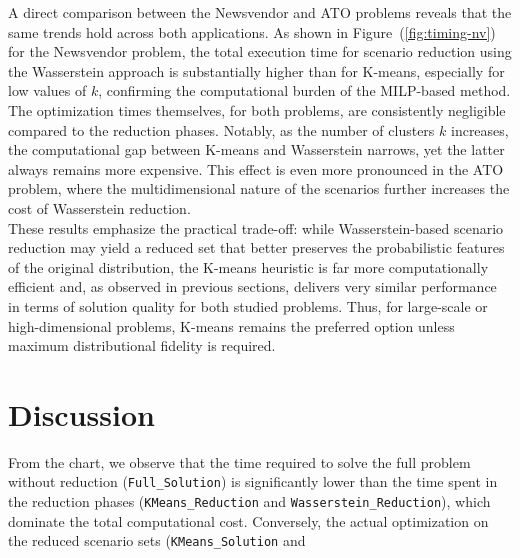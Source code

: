 \documentclass[a4paper,12pt]{article}
\begin{document}
	\noindent
	A direct comparison between the Newsvendor and ATO problems reveals that the same trends hold across both applications. As shown in Figure~(\ref{fig:timing-nv}) for the Newsvendor problem, the total execution time for scenario reduction using the Wasserstein approach is substantially higher than for K-means, especially for low values of $k$, confirming the computational burden of the MILP-based method. The optimization times themselves, for both problems, are consistently negligible compared to the reduction phases.	Notably, as the number of clusters $k$ increases, the computational gap between K-means and Wasserstein narrows, yet the latter always remains more expensive. This effect is even more pronounced in the ATO problem, where the multidimensional nature of the scenarios further increases the cost of Wasserstein reduction. \\
	
	\noindent These results emphasize the practical trade-off: while Wasserstein-based scenario reduction may yield a reduced set that better preserves the probabilistic features of the original distribution, the K-means heuristic is far more computationally efficient and, as observed in previous sections, delivers very similar performance in terms of solution quality for both studied problems. Thus, for large-scale or high-dimensional problems, K-means remains the preferred option unless maximum distributional fidelity is required.
	
	
	\newpage
	
	\section{Discussion}
	
	\noindent From the chart, we observe that the time required to solve the full problem without reduction (\texttt{Full\_Solution}) is significantly lower than the time spent in the reduction phases (\texttt{KMeans\_Reduction} and \texttt{Wasserstein\_Reduction}), which dominate the total computational cost. Conversely, the actual optimization on the reduced scenario sets (\texttt{KMeans\_Solution} and 
	
\end{document}

